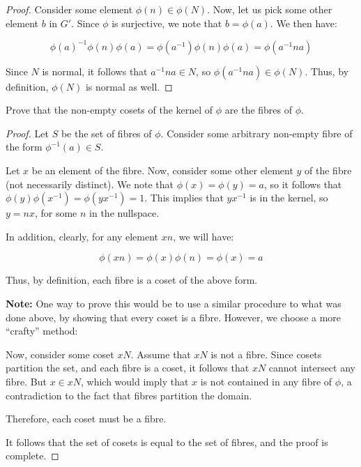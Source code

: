 \documentclass[10pt, oneside]{article}
\newenvironment{problem}[2][Problem]{\begin{trivlist}
\item[\hskip \labelsep {\bfseries #1}\hskip \labelsep {\bfseries #2.}]}{\end{trivlist}}
\begin{document}
    \begin{proof}
      Consider some element $\phi(n) \in \phi(N)$. Now, let us pick some other element $b$ in $G'$. Since $\phi$ is surjective, we note that $b = \phi(a)$. We then have:

      $$\phi(a)^{-1} \phi(n) \phi(a) = \phi(a^{-1}) \phi(n) \phi(a) = \phi(a^{-1} n a)$$

      Since $N$ is normal, it follows that $a^{-1} n a \in N$, so $\phi(a^{-1} n a) \in \phi(N)$. Thus, by definition, $\phi(N)$ is normal as well.
    \end{proof}

    \begin{problem}{5.12}
      Prove that the non-empty cosets of the kernel of $\phi$ are the fibres of $\phi$.
    \end{problem}

    \begin{proof}
      Let $S$ be the set of fibres of $\phi$. Consider some arbitrary non-empty fibre of the form $\phi^{-1}(a) \in S$.
      \newline

      Let $x$ be an element of the fibre. Now, consider some other element $y$ of the fibre (not necessarily distinct). We note that $\phi(x) = \phi(y) = a$,
      so it follows that $\phi(y) \phi(x^{-1}) = \phi(y x^{-1}) = 1$. This implies that $y x^{-1}$ is in the kernel, so $y = nx$, for some $n$ in the nullspace.
      \newline

      In addition, clearly, for any element $xn$, we will have:

      $$\phi(xn) = \phi(x) \phi(n) = \phi(x) = a$$

      Thus, by definition, each fibre is a coset of the above form.
      \newline

      \textbf{Note:} One way to prove this would be to use a similar procedure to what was done above, by showing that every coset is a fibre. However, we choose
      a more ``crafty'' method:
      \newline

      Now, consider some coset $xN$. Assume that $xN$ is not a fibre. Since cosets partition the set, and each fibre is a coset, it follows that $xN$ cannot intersect any fibre.
      But $x \in xN$, which would imply that $x$ is not contained in any fibre of $\phi$, a contradiction to the fact that fibres partition the domain.
      \newline

      Therefore, each coset must be a fibre.
      \newline

      It follows that the set of cosets is equal to the set of fibres, and the proof is complete.
    \end{proof}
\end{document}
